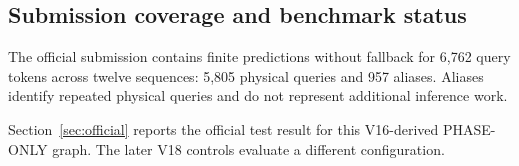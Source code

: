 \subsection{Submission coverage and benchmark status}

The official submission contains finite predictions without fallback for 6,762 query tokens across twelve sequences: 5,805 physical queries and 957 aliases. Aliases identify repeated physical queries and do not represent additional inference work. 

Section~\ref{sec:official} reports the official test result for this V16-derived PHASE-ONLY graph. The later V18 controls evaluate a different configuration. 
